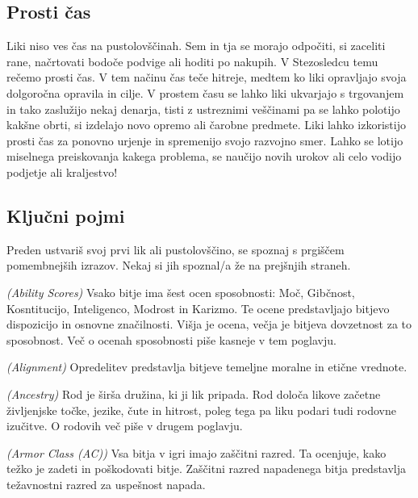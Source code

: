 \subsection{Prosti čas}
Liki niso ves čas na pustolovščinah. Sem in tja se morajo odpočiti, si zaceliti rane, načrtovati bodoče podvige ali hoditi po nakupih. V Stezosledcu temu rečemo prosti čas. V tem načinu čas teče hitreje, medtem ko liki opravljajo svoja dolgoročna opravila in cilje. V prostem času se lahko liki ukvarjajo s trgovanjem in tako zaslužijo nekaj denarja, tisti z ustreznimi veščinami pa se lahko polotijo kakšne obrti, si izdelajo novo opremo ali čarobne predmete. Liki lahko izkoristijo prosti čas za ponovno urjenje in spremenijo svojo razvojno smer. Lahko se lotijo miselnega preiskovanja kakega problema, se naučijo novih urokov ali celo vodijo podjetje ali kraljestvo!

\subsection{Ključni pojmi}

Preden ustvariš svoj prvi lik ali pustolovščino, se spoznaj s prgiščem pomembnejših izrazov. Nekaj si jih spoznal/a že na prejšnjih straneh.

\newcommand{\rpgterm}[3]{%
    \begin{description}[leftmargin=!, labelwidth=20pt]
        \item[#1] \textit{(#2)} #3
    \end{description}}

\rpgterm{Ocene sposobnosti}{Ability Scores}{Vsako bitje ima šest ocen sposobnosti: Moč, Gibčnost, Kosntitucijo, Inteligenco, Modrost in Karizmo. Te ocene predstavljajo bitjevo dispozicijo in osnovne značilnosti. Višja je ocena, večja je bitjeva dovzetnost za to sposobnost. Več o ocenah sposobnosti piše kasneje v tem poglavju.}

\rpgterm{Opredelitev}{Alignment}{Opredelitev predstavlja bitjeve temeljne moralne in etične vrednote.}

\rpgterm{Rod}{Ancestry}{Rod je širša družina, ki ji lik pripada. Rod določa likove začetne življenjske točke, jezike, čute in hitrost, poleg tega pa liku podari tudi rodovne izučitve. O rodovih več piše v drugem poglavju.}

\rpgterm{Zaščitni razred (ZR)}{Armor Class (AC)}{Vsa bitja v igri imajo zaščitni razred. Ta ocenjuje, kako težko je zadeti in poškodovati bitje. Zaščitni razred napadenega bitja predstavlja težavnostni razred za uspešnost napada.}

